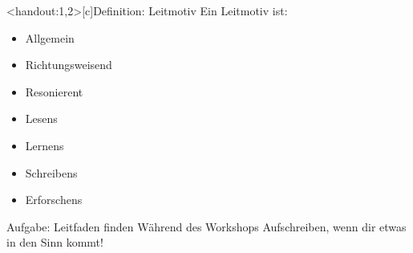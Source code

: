 \addtocounter{framenumber}{-1}
\begin{frame}<handout:1,2>[c]{Definition: Leitmotiv}
    \vspace{0.5cm}
    \large{
    Ein Leitmotiv ist:}
    \begin{itemize}[<+(1)->]
        \large
        \item Allgemein
        \item Richtungsweisend
        \item Resonierent
    \end{itemize}
    \pause
    \vspace{0.4cm}
    { 
      \addtocounter{framenumber}{1}
    }
    \begin{multicols}{2}
    \begin{itemize}[<+(1)->]
        \item Lesens
        \item Lernens
        \item Schreibens
        \item Erforschens
    \end{itemize}
    \end{multicols}
\end{frame}



\begin{frame}[c]
    \Large
    \begin{block}{Aufgabe: Leitfaden finden}
    Während des Workshops Aufschreiben, wenn dir etwas in den Sinn kommt!
    \end{block}
\end{frame}


%



